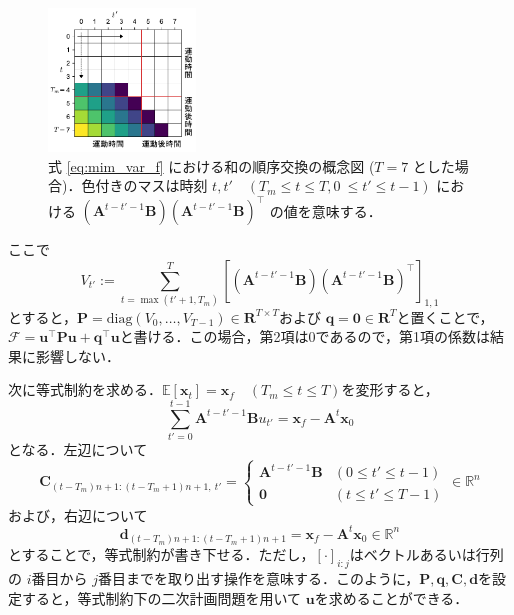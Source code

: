 \documentclass[titlepage]{ltjsbook}
\begin{document}
\begin{figure}
  \centering
  \includegraphics[width=0.35\textwidth]{./figures/minimum_variance.pdf}
  \caption{式 \ref{eq:mim_var_f} における和の順序交換の概念図 ($T=7$ とした場合)．色付きのマスは時刻 $t, t'\quad (T_m \leq t \leq T, 0\ \leq t' \leq t-1)$ における $\left(\mathbf{A}^{t-t'-1} \mathbf{B}\right)\left(\mathbf{A}^{t-t'-1} \mathbf{B}\right)^{\top}$ の値を意味する．}
  \label{fig:minimum_variance}
\end{figure}

ここで 
\begin{equation}
V_{t'}:=\sum_{t=\max(t'+1, T_m)}^{T} \left[\left(\mathbf{A}^{t-t'-1} \mathbf{B}\right)\left(\mathbf{A}^{t-t'-1} \mathbf{B}\right)^{\top} \right]_{1,1}
\end{equation}
とすると，$\mathbf{P}=\mathrm{diag}(V_0, \ldots, V_{T-1})\in \mathbf{R}^{T\times T}$および $\mathbf{q}=\mathbf{0} \in \mathbf{R}^{T}$と置くことで，$\mathcal{F}=\mathbf{u}^\top \mathbf{P}\mathbf{u}+\mathbf{q} ^{\top}\mathbf{u}$と書ける．この場合，第2項は0であるので，第1項の係数は結果に影響しない．

次に等式制約を求める．$\mathbb{E}\left[\mathbf{x}_{t}\right] = \mathbf{x}_f\quad (T_m\leq t \leq T)$を変形すると，
\begin{equation}
\sum_{t'=0}^{t-1} \mathbf{A}^{t-t'-1} \mathbf{B} u_{t'}=\mathbf{x}_f-\mathbf{A}^{t} \mathbf{x}_{0}
\end{equation}
となる．左辺について
\begin{equation}
\mathbf{C}_{(t-T_m)n+1:(t-T_m+1)n+1,\ t'}=
\begin{cases}
    \mathbf{A}^{t-t'-1} \mathbf{B} & (0\leq t'\leq t-1) \\
    \mathbf{0} & (t\leq t'\leq T-1)
\end{cases}\in \mathbb{R}^n 
\end{equation}
および，右辺について
\begin{equation}
\mathbf{d}_{(t-T_m)n+1:(t-T_m+1)n+1}=\mathbf{x}_f-\mathbf{A}^{t} \mathbf{x}_{0} \in \mathbb{R}^n 
\end{equation}
とすることで，等式制約が書き下せる．ただし，$[\cdot]_{i:j}$はベクトルあるいは行列の $i$番目から $j$番目までを取り出す操作を意味する．このように，$\mathbf{P}, \mathbf{q}, \mathbf{C}, \mathbf{d}$を設定すると，等式制約下の二次計画問題を用いて $\mathbf{u}$を求めることができる．

\printbibliography[segment=\therefsegment,heading=subbibliography,title={参考文献}]
\end{document}
